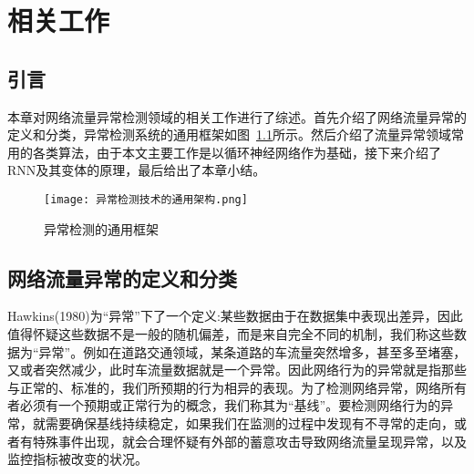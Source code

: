 
\chapter{相关工作}

\section{引言}

本章对网络流量异常检测领域的相关工作进行了综述。首先介绍了网络流量异常的定义和分类，异常检测系统的通用框架如图~\ref{fig:scheme}所示\cite{fernandes2019comprehensive}。然后介绍了流量异常领域常用的各类算法，由于本文主要工作是以循环神经网络作为基础，接下来介绍了RNN及其变体的原理，最后给出了本章小结。







\begin{figure}
    \centering
    \texttt{[image: 异常检测技术的通用架构.png]}
    \caption{异常检测的通用框架}
    \label{fig:scheme}
  \end{figure}




\section{网络流量异常的定义和分类}
Hawkins(1980)\cite{hawkins1980identification}为“异常”下了一个定义:某些数据由于在数据集中表现出差异，因此值得怀疑这些数据不是一般的随机偏差，而是来自完全不同的机制，我们称这些数据为“异常”。例如在道路交通领域，某条道路的车流量突然增多，甚至多至堵塞，又或者突然减少，此时车流量数据就是一个异常。因此网络行为的异常就是指那些与正常的、标准的，我们所预期的行为相异的表现。为了检测网络异常，网络所有者必须有一个预期或正常行为的概念，我们称其为“基线”。要检测网络行为的异常，就需要确保基线持续稳定，如果我们在监测的过程中发现有不寻常的走向，或者有特殊事件出现，就会合理怀疑有外部的蓄意攻击导致网络流量呈现异常，以及监控指标被改变的状况。

